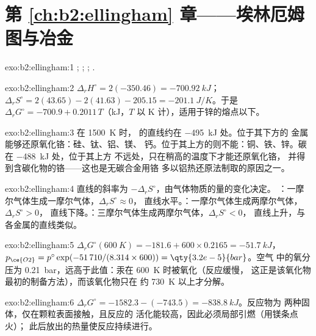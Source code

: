 \section*{第 \ref{ch:b2:ellingham} 章——埃林厄姆图与冶金}

\begin{solution}{exo:b2:ellingham:1}
; ; ;
.
\end{solution}

\begin{solution}{exo:b2:ellingham:2}
$\Delta_r H^\circ = 2(-350.46) = \qty{-700.92}{kJ}$；$\Delta_r S^\circ = 2(43.65)
- 2(41.63) - 205.15 = \qty{-201.1}{J/K}$。于是 $\Delta_r G^\circ = -700.9 +
0.2011\,T$（\unit{kJ}，$T$ 以 \unit{K} 计），适用于锌的熔点以下。
\end{solution}

\begin{solution}{exo:b2:ellingham:3}
在 \qty{1500}{K} 时， 的直线约在 \qty{-495}{kJ} 处。位于其下方的
金属能够还原氧化铬：硅、钛、铝、镁、
钙。位于其上方的则不能：铜、铁、锌。碳在 \qty{-488}{kJ} 处，位于其上方
不远处，只在稍高的温度下才能还原氧化铬，
并得到含碳化物的铬——这也是无碳合金用铬
多以铝热还原法制取的原因之一。
\end{solution}

\begin{solution}{exo:b2:ellingham:4}
直线的斜率为 $-\Delta_r S^\circ$，由气体物质的量的变化决定。
：一摩尔气体生成一摩尔气体，$\Delta_r S^\circ \approx 0$，
直线水平。：一摩尔气体生成两摩尔气体，$\Delta_r S^\circ > 0$，
直线下降。：三摩尔气体生成两摩尔气体，$\Delta_r S^\circ < 0$，
直线上升，与各金属的直线类似。
\end{solution}

\begin{solution}{exo:b2:ellingham:5}
$\Delta_r G^\circ(\qty{600}{K}) = -181.6 + 600 \times 0.2165 = \qty{-51.7}{kJ}$，
$p_{\ce{O2}} = p^\circ\exp(-51\,710/(8.314 \times 600)) = \qty{3.2e-5}{bar}$。空气
中的氧分压为 \qty{0.21}{bar}，远高于此值：汞在 \qty{600}{K} 时被氧化（反应缓慢，
这正是该氧化物最初的制备方法），而该氧化物只在
约 \qty{730}{K} 以上才分解。
\end{solution}

\begin{solution}{exo:b2:ellingham:6}
$\Delta_r G^\circ = -1582.3 - (-743.5) = \qty{-838.8}{kJ}$。反应物为
两种固体，仅在颗粒表面接触，且反应的
活化能较高，因此必须局部引燃（用镁条点火）；
此后放出的热量使反应持续进行。
\end{solution}

